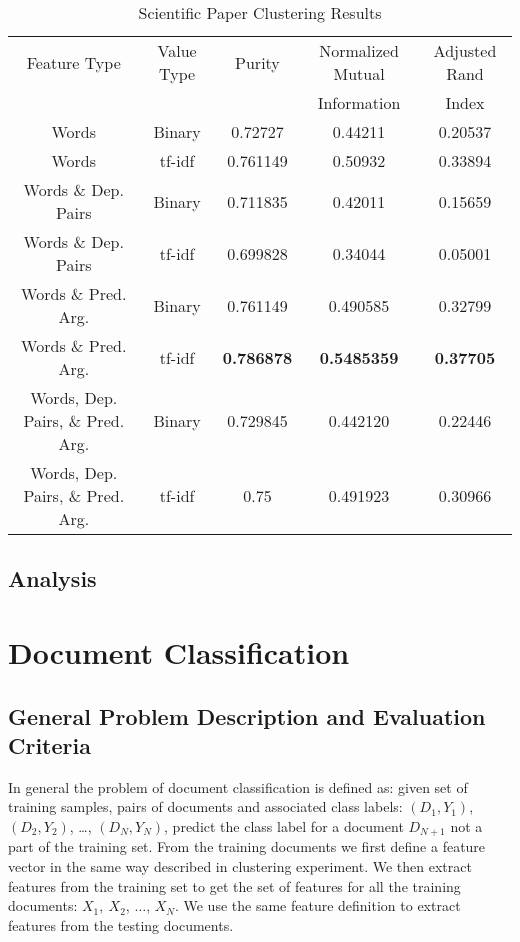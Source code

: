 \documentclass[11pt]{article}
\newcommand{\headcol}{\rowcolor{tableheadcolor}} %
\begin{document}
\begin{table}[H]
\centering
\caption{Scientific Paper Clustering Results}
\label{tbl:ScientificPaperClusteringResults}
\begin{tabular}{|c|c|c|c|c|}
\hline
\headcol \color{white} Feature Type & \color{white} Value Type & \color{white} Purity & \color{white} Normalized Mutual  & \color{white} Adjusted Rand  \\
 \headcol & & &  \color{white} Information & \color{white}  Index \\
\hline
Words & Binary & 0.72727 & 0.44211 &  0.20537  \\
Words & tf-idf &  0.761149  & 0.50932 & 0.33894\\
Words \& Dep. Pairs & Binary & 0.711835 & 0.42011 & 0.15659 \\
Words \& Dep. Pairs & tf-idf & 0.699828 & 0.34044 & 0.05001 \\
Words \& Pred. Arg. & Binary & 0.761149 & 0.490585 & 0.32799 \\
Words \& Pred. Arg.  & tf-idf & \textbf{0.786878} & \textbf{0.5485359} & \textbf{0.37705} \\
Words, Dep. Pairs, \& Pred. Arg. & Binary & 0.729845 & 0.442120 & 0.22446 \\
Words, Dep. Pairs, \& Pred. Arg.& tf-idf & 0.75 & 0.491923 & 0.30966 \\
\hline
\end{tabular}
\end{table}




\subsection{Analysis}


\section{Document Classification}

\subsection{General Problem Description and Evaluation Criteria}

In general the problem of document classification is defined as: given set of training samples, pairs of documents and associated class labels: $(D_1, Y_1)$, $(D_2, Y_2)$, \dots, $(D_N, Y_N)$, predict the class label for a document $D_{N+1}$ not a part of the training set. From the training documents we first define a feature vector in the same way described in clustering experiment. We then extract features from the training set to get the set of features for all the training documents: $X_1,\ X_2$, $\dots$, $X_N$. We use the same feature definition to extract features from the testing documents. 
\end{document}
